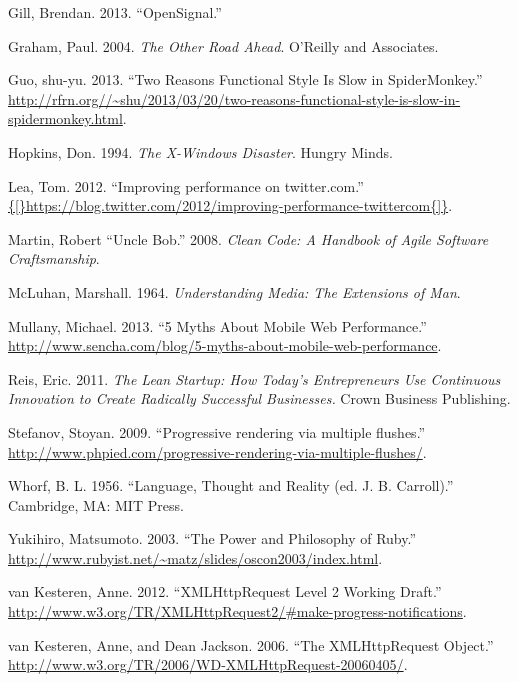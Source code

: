 \documentclass[]{article}
\begin{document}
Gill, Brendan. 2013. ``OpenSignal.''

Graham, Paul. 2004. \emph{The Other Road Ahead}. O'Reilly and
Associates.

Guo, shu-yu. 2013. ``Two Reasons Functional Style Is Slow in
SpiderMonkey.''
\url{http://rfrn.org//~shu/2013/03/20/two-reasons-functional-style-is-slow-in-spidermonkey.html}.

Hopkins, Don. 1994. \emph{The X-Windows Disaster}. Hungry Minds.

Lea, Tom. 2012. ``Improving performance on twitter.com.''
\url{{[}https://blog.twitter.com/2012/improving-performance-twittercom{]}}.

Martin, Robert ``Uncle Bob.'' 2008. \emph{Clean Code: A Handbook of
Agile Software Craftsmanship}.

McLuhan, Marshall. 1964. \emph{Understanding Media: The Extensions of
Man}.

Mullany, Michael. 2013. ``5 Myths About Mobile Web Performance.''
\url{http://www.sencha.com/blog/5-myths-about-mobile-web-performance}.

Reis, Eric. 2011. \emph{The Lean Startup: How Today's Entrepreneurs Use
Continuous Innovation to Create Radically Successful Businesses.} Crown
Business Publishing.

Stefanov, Stoyan. 2009. ``Progressive rendering via multiple flushes.''
\url{http://www.phpied.com/progressive-rendering-via-multiple-flushes/}.

Whorf, B. L. 1956. ``Language, Thought and Reality (ed. J. B.
Carroll).'' Cambridge, MA: MIT Press.

Yukihiro, Matsumoto. 2003. ``The Power and Philosophy of Ruby.''
\url{http://www.rubyist.net/~matz/slides/oscon2003/index.html}.

van Kesteren, Anne. 2012. ``XMLHttpRequest Level 2 Working Draft.''
\url{http://www.w3.org/TR/XMLHttpRequest2/\#make-progress-notifications}.

van Kesteren, Anne, and Dean Jackson. 2006. ``The XMLHttpRequest
Object.'' \url{http://www.w3.org/TR/2006/WD-XMLHttpRequest-20060405/}.
\end{document}
